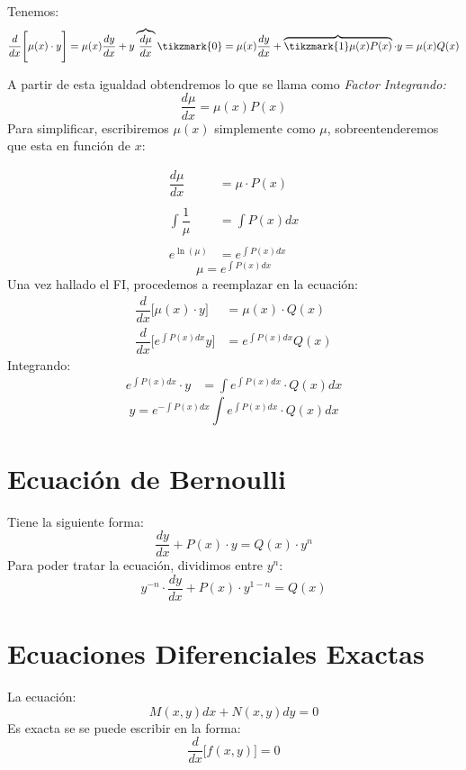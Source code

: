 Tenemos:
\[
\dfrac{d}{dx}\Bigg[\mu(x)\cdot y\Bigg]=\mu(x)\dfrac{dy}{dx}+y  \overbrace{\dfrac{d\mu}{dx}}\tikzmark{0}=\mu(x)\dfrac{dy}{dx}+ \overbrace{\tikzmark{1}\mu(x)P(x)}\cdot y =  \mu(x)Q(x)
\]
%

\pagebreak
A partir de esta igualdad obtendremos lo que se llama como \textit{Factor Integrando:}
$$\dfrac{d\mu}{dx}=\mu(x)P(x)$$
Para simplificar, escribiremos $\mu(x)$ simplemente como $\mu$, sobreentenderemos que esta en función de $x$:

\begin{align*}
\dfrac{d\mu}{dx} & = \mu \cdot P(x) \\{ }\\
\int\dfrac{1}{\mu} & = \int P(x) dx \\{ }\\
e^{\ln(\mu)} & = e^{\int P(x) dx}
\end{align*}
\begin{equation}
\mu  = e^{\int P(x) dx}
\end{equation}
Una vez hallado el FI, procedemos a reemplazar en la ecuación:
\begin{align*}
\dfrac{d}{dx}\Big[ \mu(x)\cdot y \Big] & = \mu(x)\cdot Q(x) \\
\dfrac{d}{dx}\Big[ e^{\int P(x)dx} y \Big] & = e^{\int P(x) dx} Q(x)
\end{align*}
Integrando:
\begin{align*}
e^{\int P(x) dx} \cdot y & = \int e^{\int P(x) dx} \cdot Q(x) dx
\end{align*}
$$ \boxed{y  = e^{-\int P(x) dx} \int e^{\int P(x) dx} \cdot Q(x) dx}$$
\section{Ecuación de Bernoulli}
Tiene la siguiente forma:
$$\dfrac{dy}{dx}+P(x)\cdot y =Q(x)\cdot y^n $$
Para poder tratar la ecuación, dividimos entre $y^n$:
$$y^{-n}\cdot\dfrac{dy}{dx}+P(x)\cdot y^{1-n} =Q(x)$$
\section{Ecuaciones Diferenciales Exactas}
La ecuación:
\begin{equation}
M(x,y)dx+N(x,y)dy=0
\end{equation}
Es exacta se se puede escribir en la forma:
$$\dfrac{d}{dx}\Big[ f(x,y) \Big] = 0$$
